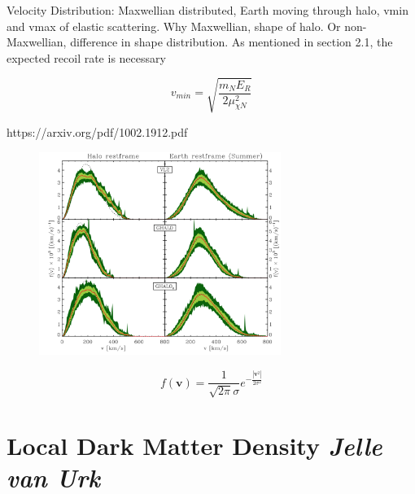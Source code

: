 \documentclass{article}
\begin{document}
Velocity Distribution:
Maxwellian distributed, Earth moving through halo, vmin and vmax of elastic scattering. \cite{Kavanagh:2014rya} Why Maxwellian, shape of halo. 
Or non-Maxwellian, difference in shape distribution. 
As mentioned in section 2.1, the expected recoil rate is necessary 


\begin{equation}
    v_{min} = \sqrt{\frac{m_{N}E_{R}}{2\mu^{2}_{\chi N}}}
\end{equation}

https://arxiv.org/pdf/1002.1912.pdf
\begin{figure}[h]
    \centering
    \includegraphics[width=0.7\textwidth]{Vel-dist.png}
    \caption{}
\end{figure}


\begin{equation}
    f(\textbf{v}) = \frac{1}{\sqrt{2\pi}\sigma}e^{-\frac{|\textbf{v}^{2}|}{2\sigma^{2}}}
\end{equation}

\section{Local Dark Matter Density \small{\textit{Jelle van Urk}}} \label{Local_DM_Density}
\end{document}
